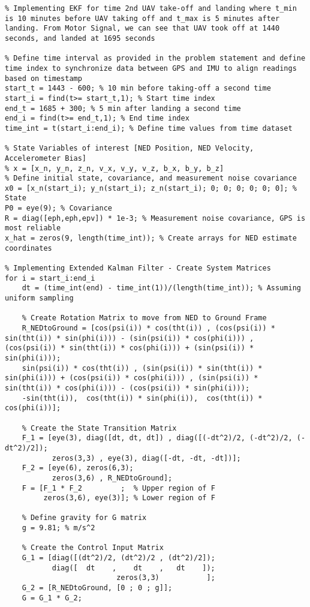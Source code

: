 \begin{lstlisting}
% Implementing EKF for time 2nd UAV take-off and landing where t_min is 10 minutes before UAV taking off and t_max is 5 minutes after landing. From Motor Signal, we can see that UAV took off at 1440 seconds, and landed at 1695 seconds

% Define time interval as provided in the problem statement and define time index to synchronize data between GPS and IMU to align readings based on timestamp
start_t = 1443 - 600; % 10 min before taking-off a second time
start_i = find(t>= start_t,1); % Start time index
end_t = 1685 + 300; % 5 min after landing a second time
end_i = find(t>= end_t,1); % End time index
time_int = t(start_i:end_i); % Define time values from time dataset

% State Variables of interest [NED Position, NED Velocity, Accelerometer Bias]
% x = [x_n, y_n, z_n, v_x, v_y, v_z, b_x, b_y, b_z]
% Define initial state, covariance, and measurement noise covariance
x0 = [x_n(start_i); y_n(start_i); z_n(start_i); 0; 0; 0; 0; 0; 0]; % State
P0 = eye(9); % Covariance
R = diag([eph,eph,epv]) * 1e-3; % Measurement noise covariance, GPS is most reliable
x_hat = zeros(9, length(time_int)); % Create arrays for NED estimate coordinates

% Implementing Extended Kalman Filter - Create System Matrices
for i = start_i:end_i
    dt = (time_int(end) - time_int(1))/(length(time_int)); % Assuming uniform sampling

    % Create Rotation Matrix to move from NED to Ground Frame
    R_NEDtoGround = [cos(psi(i)) * cos(tht(i)) , (cos(psi(i)) * sin(tht(i)) * sin(phi(i))) - (sin(psi(i)) * cos(phi(i))) , (cos(psi(i)) * sin(tht(i)) * cos(phi(i))) + (sin(psi(i)) * sin(phi(i)));
    sin(psi(i)) * cos(tht(i)) , (sin(psi(i)) * sin(tht(i)) * sin(phi(i))) + (cos(psi(i)) * cos(phi(i))) , (sin(psi(i)) * sin(tht(i)) * cos(phi(i))) - (cos(psi(i)) * sin(phi(i)));
    -sin(tht(i)),  cos(tht(i)) * sin(phi(i)),  cos(tht(i)) * cos(phi(i))];
    
    % Create the State Transition Matrix
    F_1 = [eye(3), diag([dt, dt, dt]) , diag([(-dt^2)/2, (-dt^2)/2, (-dt^2)/2]); 
           zeros(3,3) , eye(3), diag([-dt, -dt, -dt])];
    F_2 = [eye(6), zeros(6,3);
           zeros(3,6) , R_NEDtoGround];
    F = [F_1 * F_2         ;  % Upper region of F
         zeros(3,6), eye(3)]; % Lower region of F

    % Define gravity for G matrix
    g = 9.81; % m/s^2

    % Create the Control Input Matrix
    G_1 = [diag([(dt^2)/2, (dt^2)/2 , (dt^2)/2]);
           diag([  dt    ,    dt    ,   dt    ]);
                          zeros(3,3)           ];
    G_2 = [R_NEDtoGround, [0 ; 0 ; g]];
    G = G_1 * G_2;


\end{lstlisting}
